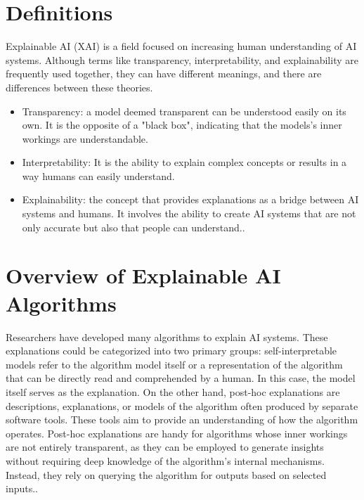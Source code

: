 \documentclass[10pt,journal,compsoc]{IEEEtran}
\begin{document}
\section{Definitions}

Explainable AI (XAI) is a field focused on increasing human understanding of AI systems. Although terms like transparency, interpretability, and explainability are frequently used together, they can have different meanings, and there are differences between these theories.\cite{antoniadi2021current}

\begin{itemize}
    \item {Transparency}: a model deemed transparent can be understood easily on its own. It is the opposite of a "black box", indicating that the models's inner workings are understandable\cite{transparency}.
    \item {Interpretability}: It is the ability to explain complex concepts or results in a way humans can easily understand\cite{gilpin2019explaining}.
    \item {Explainability}: the concept that provides explanations as a bridge between AI systems and humans. It involves the ability to create AI systems that are not only accurate but also that people can understand.\cite{gilpin2019explaining}.
\end{itemize}

\section{Overview of Explainable AI Algorithms}
Researchers have developed many algorithms to explain AI systems. These explanations could be categorized into two primary groups: self-interpretable models refer to the algorithm model itself or a representation of the algorithm that can be directly read and comprehended by a human. In this case, the model itself serves as the explanation. On the other hand, post-hoc explanations are descriptions, explanations, or models of the algorithm often produced by separate software tools. These tools aim to provide an understanding of how the algorithm operates. Post-hoc explanations are handy for algorithms whose inner workings are not entirely transparent, as they can be employed to generate insights without requiring deep knowledge of the algorithm's internal mechanisms. Instead, they rely on querying the algorithm for outputs based on selected inputs.\cite{phillips2020four}.
\end{document}
